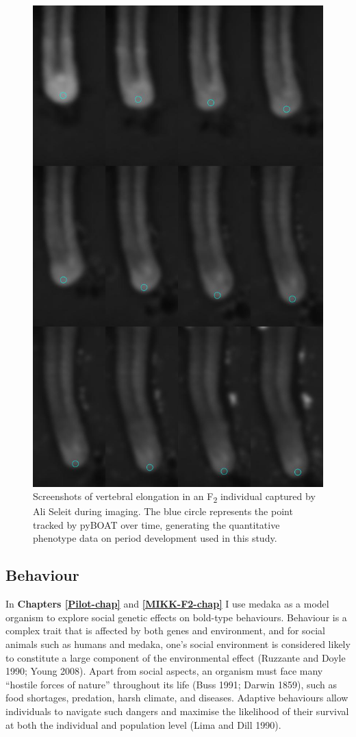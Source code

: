 \documentclass[
]{book}
\begin{document}
\begin{figure}
\includegraphics[width=0.8\linewidth]{figs/somites/ali_compiled_somite_elong} \caption{Screenshots of vertebral elongation in an F\textsubscript{2} individual captured by Ali Seleit during imaging. The blue circle represents the point tracked by pyBOAT over time, generating the quantitative phenotype data on period development used in this study.}\label{fig:somite-period-ali}
\end{figure}

\hypertarget{behaviour}{%
\subsection{Behaviour}\label{behaviour}}

In \textbf{Chapters \ref{Pilot-chap}} and \textbf{\ref{MIKK-F2-chap}} I use medaka as a model organism to explore social genetic effects on bold-type behaviours. Behaviour is a complex trait that is affected by both genes and environment, and for social animals such as humans and medaka, one's social environment is considered likely to constitute a large component of the environmental effect (Ruzzante and Doyle 1990; Young 2008). Apart from social aspects, an organism must face many ``hostile forces of nature'' throughout its life (Buss 1991; Darwin 1859), such as food shortages, predation, harsh climate, and diseases. Adaptive behaviours allow individuals to navigate such dangers and maximise the likelihood of their survival at both the individual and population level (Lima and Dill 1990).
\end{document}
